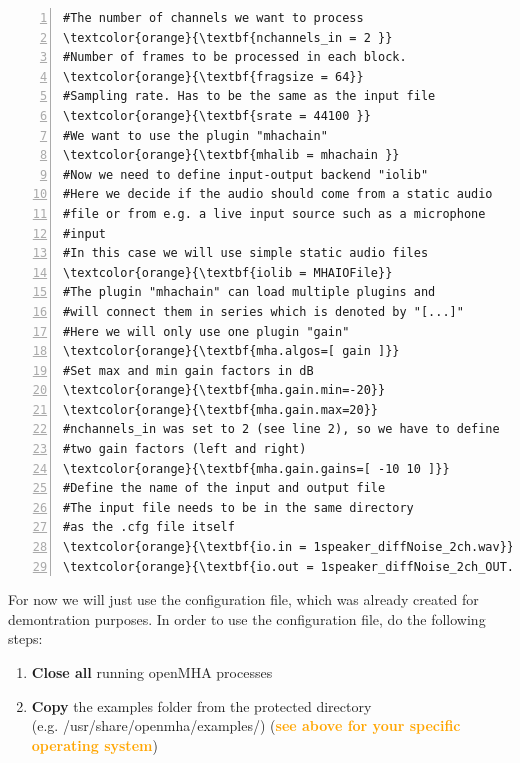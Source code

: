 \documentclass[11pt,a4paper,twoside]{article}
\newcommand{\+}{\discretionary{\mbox{\scriptsize$\hookleftarrow$}}{}{}}
\begin{document}
{{{\begin{Verbatim}[frame=single,numbers=left,commandchars=\\\{\}]
#The number of channels we want to process
\textcolor{orange}{\textbf{nchannels_in = 2 }}
#Number of frames to be processed in each block.
\textcolor{orange}{\textbf{fragsize = 64}}
#Sampling rate. Has to be the same as the input file
\textcolor{orange}{\textbf{srate = 44100 }}
#We want to use the plugin "mhachain"
\textcolor{orange}{\textbf{mhalib = mhachain }}
#Now we need to define input-output backend "iolib"
#Here we decide if the audio should come from a static audio
#file or from e.g. a live input source such as a microphone
#input
#In this case we will use simple static audio files
\textcolor{orange}{\textbf{iolib = MHAIOFile}}
#The plugin "mhachain" can load multiple plugins and
#will connect them in series which is denoted by "[...]"
#Here we will only use one plugin "gain"
\textcolor{orange}{\textbf{mha.algos=[ gain ]}}
#Set max and min gain factors in dB
\textcolor{orange}{\textbf{mha.gain.min=-20}}
\textcolor{orange}{\textbf{mha.gain.max=20}}
#nchannels_in was set to 2 (see line 2), so we have to define 
#two gain factors (left and right)
\textcolor{orange}{\textbf{mha.gain.gains=[ -10 10 ]}}
#Define the name of the input and output file
#The input file needs to be in the same directory 
#as the .cfg file itself
\textcolor{orange}{\textbf{io.in = 1speaker_diffNoise_2ch.wav}}
\textcolor{orange}{\textbf{io.out = 1speaker_diffNoise_2ch_OUT.wav}}
\end{Verbatim} 



\newpage 
For now we will just use the configuration file, which was already created for demontration purposes. In order to use the configuration file, do the following steps:


\begin{enumerate}
    \item \textbf{Close all} running openMHA processes
    
    \item \textbf{Copy} the examples folder from the protected directory
    \\ (e.g. /usr/share/openmha/examples/) (\textcolor{orange}{\textbf{see above for your specific operating system}})
   

\end{enumerate}}}}
\end{document}
